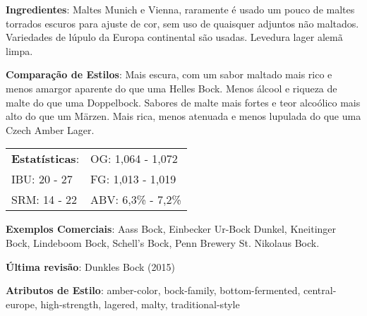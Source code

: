 \textbf{Ingredientes}: Maltes Munich e Vienna, raramente é usado um pouco de maltes torrados escuros para ajuste de cor, sem uso de quaisquer adjuntos não maltados. Variedades de lúpulo da Europa continental são usadas. Levedura lager alemã limpa.

\textbf{Comparação de Estilos}: Mais escura, com um sabor maltado mais rico e menos amargor aparente do que uma Helles Bock. Menos álcool e riqueza de malte do que uma Doppelbock. Sabores de malte mais fortes e teor alcoólico mais alto do que um Märzen. Mais rica, menos atenuada e menos lupulada do que uma Czech Amber Lager.

\begin{tabular}{@{}p{35mm}p{35mm}@{}}
  \textbf{Estatísticas}: & OG: 1,064 - 1,072 \\
  IBU: 20 - 27 & FG: 1,013 - 1,019 \\
  SRM: 14 - 22 & ABV: 6,3\% - 7,2\%
\end{tabular}

\textbf{Exemplos Comerciais}: Aass Bock, Einbecker Ur-Bock Dunkel, Kneitinger Bock, Lindeboom Bock, Schell’s Bock, Penn Brewery St. Nikolaus Bock.

\textbf{Última revisão}: Dunkles Bock (2015)

\textbf{Atributos de Estilo}: amber-color, bock-family, bottom-fermented, central-europe, high-strength, lagered, malty, traditional-style

